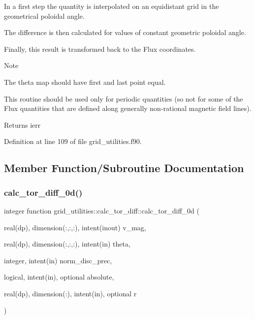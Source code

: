 In a first step the quantity is interpolated on an equidistant grid in the geometrical poloidal angle.

The difference is then calculated for values of constant geometric poloidal angle.

Finally, this result is transformed back to the Flux coordinates.

\begin{DoxyNote}{Note}

\begin{DoxyEnumerate}
\item The theta map should have first and last point equal.
\item This routine should be used only for periodic quantities (so not for some of the Flux quantities that are defined along generally non-\/rational magnetic field lines).
\end{DoxyEnumerate}
\end{DoxyNote}
\begin{DoxyReturn}{Returns}
ierr 
\end{DoxyReturn}


Definition at line 109 of file grid\+\_\+utilities.\+f90.



\subsection{Member Function/\+Subroutine Documentation}
\mbox{\label{interfacegrid__utilities_1_1calc__tor__diff_ad40f28f8c9714e5a1c778ec60994970e}} 
\subsubsection{\texorpdfstring{calc\+\_\+tor\+\_\+diff\+\_\+0d()}{calc\_tor\_diff\_0d()}}
{\footnotesize\ttfamily integer function grid\+\_\+utilities\+::calc\+\_\+tor\+\_\+diff\+::calc\+\_\+tor\+\_\+diff\+\_\+0d (\begin{DoxyParamCaption}\item[{real(dp), dimension(\+:,\+:,\+:), intent(inout)}]{v\+\_\+mag,  }\item[{real(dp), dimension(\+:,\+:,\+:), intent(in)}]{theta,  }\item[{integer, intent(in)}]{norm\+\_\+disc\+\_\+prec,  }\item[{logical, intent(in), optional}]{absolute,  }\item[{real(dp), dimension(\+:), intent(in), optional}]{r }\end{DoxyParamCaption})}



